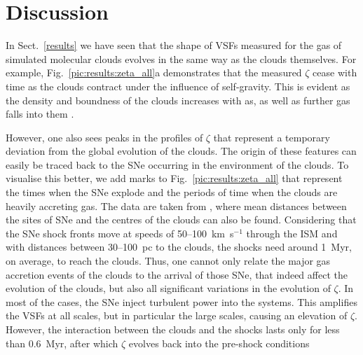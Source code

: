 \section{Discussion}\label{discussion}

In Sect.~\ref{results} we have seen that the shape of VSFs measured for the gas of simulated molecular clouds evolves in the same way as the clouds themselves.
For example, Fig.~\ref{pic:results:zeta_all}a demonstrates that the measured $\zeta$ cease with time as the clouds contract under the influence of self-gravity.
This is evident as the density and boundness of the clouds increases with as, as well as further gas falls into them .

However, one also sees peaks in the profiles of $\zeta$ that represent a temporary deviation from the global evolution of the clouds.
The origin of these features can easily be traced back to the SNe occurring in the environment of the clouds.
To visualise this better, we add marks to Fig.~\ref{pic:results:zeta_all} that represent the times when the SNe explode and the periods of time when the clouds are heavily accreting gas.
The data are taken from , where mean distances between the sites of SNe and the centres of the clouds can also be found.
Considering that the SNe shock fronts move at speeds of 50--100~km~s$^{-1}$ through the ISM and with distances between 30--100~pc to the clouds, the shocks need around 1~Myr, on average, to reach the clouds.
Thus, one cannot only relate the major gas accretion events of the clouds to the arrival of those SNe, that indeed affect the evolution of the clouds, but also all significant variations in the evolution of $\zeta$.
In most of the cases, the SNe inject turbulent power into the systems.
This amplifies the VSFs at all scales, but in particular the large scales, causing an elevation of $\zeta$.
However, the interaction between the clouds and the shocks lasts only for less than 0.6~Myr, after which $\zeta$ evolves back into the pre-shock conditions

